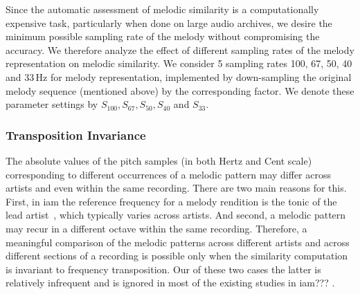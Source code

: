 Since the automatic assessment of melodic similarity is a computationally expensive task, particularly when done on large audio archives, we desire the minimum possible sampling rate of the melody without compromising the accuracy. We therefore analyze the effect of different sampling rates of the melody representation on melodic similarity. We consider 5 sampling rates 100, 67, 50, 40 and 33\,Hz for melody representation, implemented by down-sampling the original melody sequence (mentioned above) by the corresponding factor. We denote these parameter settings by $S_{100}, S_{67}, S_{50}, S_{40}$ and $S_{33}$.

\subsubsection{Transposition Invariance}
\label{sec:patterns_melodic_similarity_transposition_invariance}

The absolute values of the pitch samples (in both Hertz and Cent scale) corresponding to different occurrences of a melodic pattern may differ across artists and even within the same recording. There are two main reasons for this. First, in \gls{iam} the reference frequency for a melody rendition is the tonic of the lead artist~\citep{Gulati2014Tonic}, which typically varies across artists. And second, a melodic pattern may recur in a different octave within the same recording. Therefore, a meaningful comparison of the melodic patterns across different artists and across different sections of a recording is possible only when the similarity computation is invariant to frequency transposition. Our of these two cases the latter is relatively infrequent and is ignored in most of the existing studies in \gls{iam}??? .

